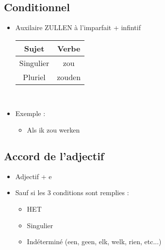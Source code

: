 \documentclass[a4paper]{article}
\begin{document}
\subsection{Conditionnel}
\begin{itemize}[label=\textbullet, font=\Large]
  \item Auxilaire ZULLEN à l'imparfait + infintif\\[0.2cm]
  \begin{tabular}{|c|c|}
      \hline
      \textbf{Sujet} & \textbf{Verbe}\\
      \hline
      Singulier & zou\\
      \hline
      Pluriel & zouden\\
      \hline
    \end{tabular}\\
  \item Exemple :
  \begin{itemize}[label=, font=\scriptsize]
    \item Als ik zou werken
  \end{itemize}
\end{itemize}

\subsection{Accord de l'adjectif}
\begin{itemize}[label=\textbullet, font=\Large]
  \item Adjectif + e
  \item Sauf si les 3 conditions sont remplies :
  \begin{itemize}[label=, font=\scriptsize]
    \item HET
    \item Singulier
    \item Indéterminé (een, geen, elk, welk, rien, etc...)
  \end{itemize}
\end{itemize}
\end{document}
